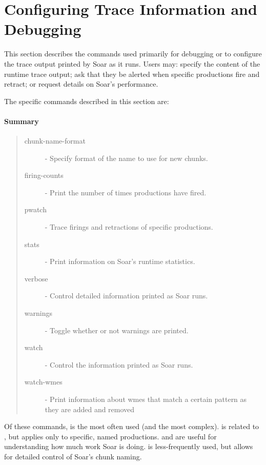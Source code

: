 \section{Configuring Trace Information and Debugging}
\label{DEBUG}

This section describes the commands used primarily for debugging or
to configure the trace output printed by Soar as it runs.  Users may:
specify the content of the runtime trace output; ask that
they be alerted when specific productions fire and retract; 
or request details on Soar's performance.

The specific commands described in this section are:


\paragraph{Summary}
\begin{quote}
\begin{description}
\item[chunk-name-format] - Specify format of the name to use for new chunks.
\item[firing-counts] - Print the number of times productions have fired.
\item[pwatch] - Trace firings and retractions of specific productions.
\item[stats] - Print information on Soar's runtime statistics.
\item[verbose] -  Control detailed information printed as Soar runs.
\item[warnings] - Toggle whether or not warnings are printed.
\item[watch] - Control the information printed as Soar runs.
\item[watch-wmes] -  Print information about wmes that match a certain pattern as they are added and removed
\end{description}
\end{quote}

Of these commands,  is the most often used (and the most 
complex).  is related to , but applies only 
to specific, named productions.  and  
are useful for understanding how much work Soar is doing.  is less-frequently
used, but allows for detailed control of Soar's chunk naming.

